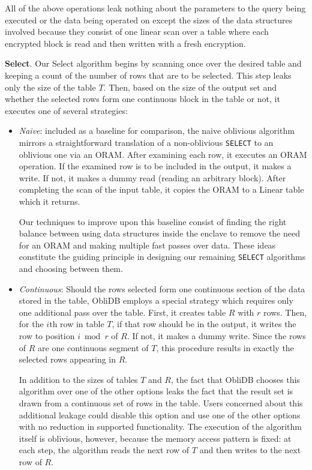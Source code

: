 \documentclass[letterpaper,twocolumn,10pt]{article}
\def\name/{ObliDB}
\begin{document}
All of the above operations leak nothing about the parameters to the query being executed or the data being operated on except the sizes of the data structures involved because they consist of one linear scan over a table where each encrypted block is read and then written with a fresh encryption. 

  \noindent \textbf{Select}. 
Our Select algorithm begins by scanning once over the desired table and keeping a count of the number of rows that are to be selected. This step leaks only the size of the table $T$. Then, based on the size of the output set and whether the selected rows form one continuous block in the table or not, it executes one of several strategies:
\begin{itemize}[itemsep=0pt,parsep=0pt]
\item \textit{Naive}: included as a baseline for comparison, the naive oblivious algorithm mirrors a straightforward translation of a non-oblivious \texttt{SELECT} to an oblivious one via an ORAM. After examining each row, it executes an ORAM operation. If the examined row is to be included in the output, it makes a write. If not, it makes a dummy read (reading an arbitrary block). After completing the scan of the input table, it copies the ORAM to a Linear table which it returns. 

Our techniques to improve upon this baseline consist of finding the right balance between using data structures inside the enclave to remove the need for an ORAM and making multiple fast passes over data. These ideas constitute the guiding principle in designing our remaining \texttt{SELECT} algorithms and choosing between them. 

\item \textit{Continuous}: Should the rows selected form one continuous section of the data stored in the table, \name/ employs a special strategy which requires only one additional pass over the table. First, it creates table $R$ with $r$ rows. Then, for the $i$th row in table $T$, if that row should be in the output, it writes the row to position $i\bmod r$ of $R$. If not, it makes a dummy write. Since the rows of $R$ are one continuous segment of $T$, this procedure results in exactly the selected rows appearing in $R$. 

In addition to the sizes of tables $T$ and $R$, the fact that \name/ chooses this algorithm over one of the other options leaks the fact that the result set is drawn from a continuous set of rows in the table. Users concerned about this additional leakage could disable this option and use one of the other options with no reduction in supported functionality. The execution of the algorithm itself is oblivious, however, because the memory access pattern is fixed: at each step, the algorithm reads the next row of $T$ and then writes to the next row of $R$. 


\end{itemize}
\end{document}
